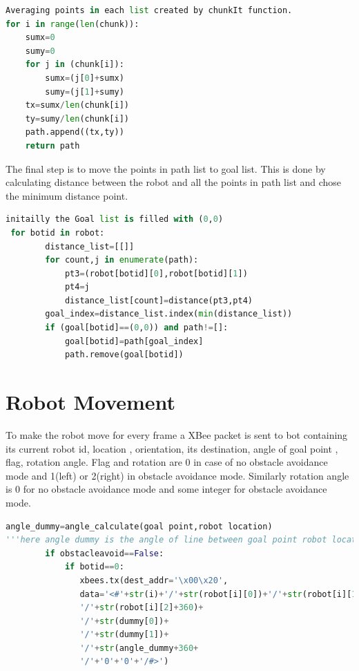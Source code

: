 \documentclass[main.tex]{subfiles}
\begin{document}
\begin{enumerate}
\begin{lstlisting}[language=Python, caption = Point selection from a shape]
Averaging points in each list created by chunkIt function.
for i in range(len(chunk)):
	sumx=0
    sumy=0
    for j in (chunk[i]):       
    	sumx=(j[0]+sumx)
        sumy=(j[1]+sumy)
    tx=sumx/len(chunk[i])
    ty=sumy/len(chunk[i])
    path.append((tx,ty))
    return path
\end{lstlisting}


The final step is to move the points in path list to goal list. This is done by calculating distance between the robot and all the points in path list and chose the minimum distance point.

\begin{lstlisting}[language=Python, caption = Goal allocation]
initailly the Goal list is filled with (0,0)  
 for botid in robot:
        distance_list=[[]]
        for count,j in enumerate(path):            
            pt3=(robot[botid][0],robot[botid][1])
            pt4=j
            distance_list[count]=distance(pt3,pt4)
        goal_index=distance_list.index(min(distance_list))
        if (goal[botid]==(0,0)) and path!=[]:
            goal[botid]=path[goal_index]
            path.remove(goal[botid])
\end{lstlisting}
\end{enumerate} 

\section{Robot Movement}
To make the robot move for every frame a XBee packet is sent to bot containing its current robot id, location , orientation, its destination, angle of goal point , flag, rotation angle.
Flag and rotation are 0 in case of no obstacle avoidance mode and 1(left) or 2(right) in obstacle avoidance mode.
Similarly rotation angle is 0 for no obstacle avoidance mode and some integer for obstacle avoidance mode.

\pagebreak
\begin{lstlisting}[language=Python, caption = Robot Movement]
angle_dummy=angle_calculate(goal point,robot location)
'''here angle dummy is the angle of line between goal point robot location , w.r.t horizontal axis'''
        if obstacleavoid==False:
            if botid==0:
               xbees.tx(dest_addr='\x00\x20',
               data='<#'+str(i)+'/'+str(robot[i][0])+'/'+str(robot[i][1])+
               '/'+str(robot[i][2]+360)+
               '/'+str(dummy[0])+
               '/'+str(dummy[1])+
               '/'+str(angle_dummy+360+
               '/'+'0'+'0'+'/#>')
\end{lstlisting}
\end{document}
